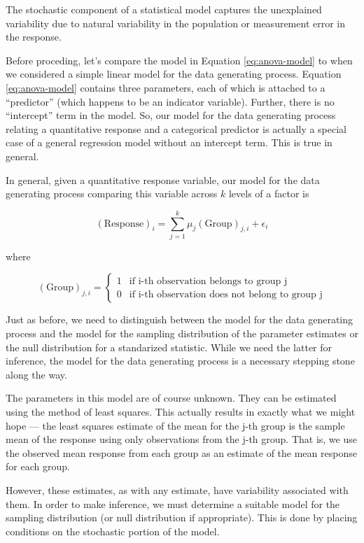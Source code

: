 \documentclass[]{book}
\theoremstyle{plain}
\theoremstyle{mydefn}
\theoremstyle{myexmpl}
\theoremstyle{remark}
\let\BeginKnitrBlock\begin \let\EndKnitrBlock\end
\let\BeginKnitrBlock\begin \let\EndKnitrBlock\end
\begin{document}
\BeginKnitrBlock{rmdkeyidea}
The stochastic component of a statistical model captures the unexplained
variability due to natural variability in the population or measurement
error in the response.
\EndKnitrBlock{rmdkeyidea}

Before proceding, let's compare the model in Equation
\eqref{eq:anova-model} to when we considered a simple linear model for the
data generating process. Equation \eqref{eq:anova-model} contains three
parameters, each of which is attached to a ``predictor'' (which happens
to be an indicator variable). Further, there is no ``intercept'' term in
the model. So, our model for the data generating process relating a
quantitative response and a categorical predictor is actually a special
case of a general regression model without an intercept term. This is
true in general.

\BeginKnitrBlock{rmdtip}
In general, given a quantitative response variable, our model for the
data generating process comparing this variable across \(k\) levels of a
factor is

\[(\text{Response})_i = \sum_{j=1}^{k} \mu_j (\text{Group})_{j, i} + \epsilon_i\]

where

\[(\text{Group})_{j,i} = \begin{cases}
  1 & \text{if i-th observation belongs to group j} \\
  0 & \text{if i-th observation does not belong to group j}
  \end{cases}\]
\EndKnitrBlock{rmdtip}

Just as before, we need to distinguish between the model for the data
generating process and the model for the sampling distribution of the
parameter estimates or the null distribution for a standarized
statistic. While we need the latter for inference, the model for the
data generating process is a necessary stepping stone along the way.

The parameters in this model are of course unknown. They can be
estimated using the method of least squares. This actually results in
exactly what we might hope --- the least squares estimate of the mean
for the j-th group is the sample mean of the response using only
observations from the j-th group. That is, we use the observed mean
response from each group as an estimate of the mean response for each
group.

However, these estimates, as with any estimate, have variability
associated with them. In order to make inference, we must determine a
suitable model for the sampling distribution (or null distribution if
appropriate). This is done by placing conditions on the stochastic
portion of the model.
\end{document}
